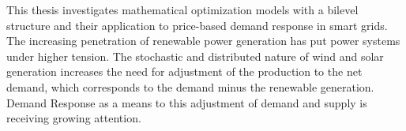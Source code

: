 This thesis investigates mathematical optimization models
with a bilevel structure and their application to price-based
demand response in smart grids.\clinebreak
The increasing penetration of renewable power generation
has put power systems under higher tension.
The stochastic and distributed nature of wind and solar generation
increases the need for adjustment of the production to the net demand,
which corresponds to the
demand minus the renewable generation.\clinebreak
Demand Response as a means to this adjustment of demand and
supply is receiving growing attention.
